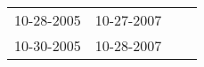 \begin{supertabular}{llll}
 10-28-2005 &  10-27-2007 \\
 10-30-2005 &  10-28-2007 \\
\end{supertabular}
